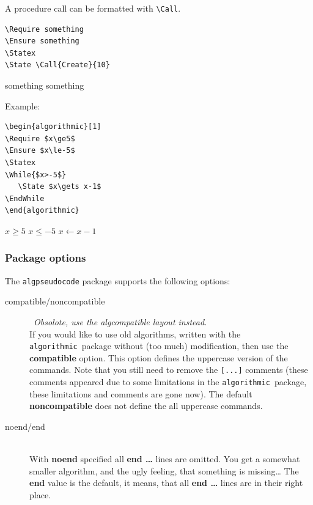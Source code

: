 \documentclass{article}
\newcommand{\old}{\texttt{algorithmic}}
\newcommand\ASTART{\bigskip\noindent\begin{minipage}[b]{0.5\linewidth}}
\newcommand\ACONTINUE{\end{minipage}\begin{minipage}[b]{0.5\linewidth}}
\newcommand\AENDSKIP{\end{minipage}\bigskip}
\newcommand\AEND{\end{minipage}}
\begin{document}
A procedure call can be formatted with \verb:\Call:.

\ASTART
\begin{verbatim}
\Require something
\Ensure something
\Statex
\State \Call{Create}{10}
\end{verbatim}
\ACONTINUE
\begin{algorithmic}[1]
\Require something
\Ensure something
\Statex
\State {}
\end{algorithmic}
\AENDSKIP

\noindent Example:

\ASTART
\begin{verbatim}
\begin{algorithmic}[1]
\Require $x\ge5$
\Ensure $x\le-5$
\Statex
\While{$x>-5$}
   \State $x\gets x-1$
\EndWhile
\end{algorithmic}
\end{verbatim}
\ACONTINUE
\begin{algorithmic}[1]
\Require $x\ge5$
\Ensure $x\le-5$
\Statex
{}
   \State $x\gets x-1$
\EndWhile
\Statex
\end{algorithmic}
\AEND

\subsubsection{Package options}\label{algpseudocode package options}

The \texttt{algpseudocode} package supports the following options:

\begin{description}
\item[compatible/noncompatible]\ \textit{Obsolote, use the algcompatible layout instead.}\\
If you would like to use old 
algorithms, written with the \old\ package without (too much) 
modification, then use the \textbf{compatible} option. This option 
defines the uppercase version of the commands. Note that you still need 
to remove the \verb:[...]: comments (these comments appeared due to some 
limitations in the \old\ package, these limitations and comments are gone now).
The default \textbf{noncompatible} does not define the all uppercase 
commands.
\item[noend/end]\ \\With \textbf{noend} specified all \textbf{end \dots} 
lines are omitted. You get a somewhat smaller algorithm, and the ugly 
feeling, that something is missing\dots{} The \textbf{end} value is the 
default, it means, that all \textbf{end \dots} lines are in their right 
place.
\end{description}
\end{document}
